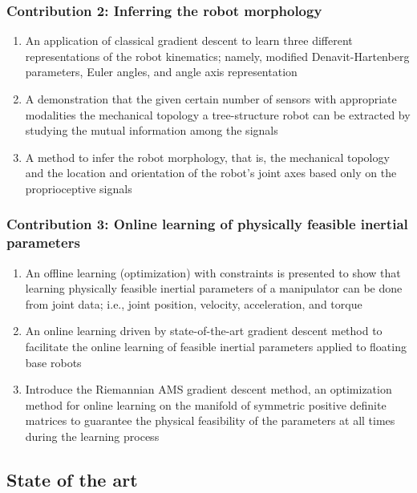 \documentclass[12pt, a4paper]{article}
\begin{document}
\subsubsection*{Contribution 2: Inferring the robot morphology}
\begin{enumerate}
	\item An application of classical gradient descent to learn three different representations of the robot kinematics; namely, modified Denavit-Hartenberg parameters, Euler angles, and angle axis representation
	\item A demonstration that the given certain number of sensors with appropriate modalities the mechanical topology a tree-structure robot can be extracted by studying the mutual information among the signals
	\item A method to infer the robot morphology, that is, the mechanical topology and the location and orientation of the robot's joint axes based only on the proprioceptive signals

\end{enumerate}

\subsubsection*{Contribution 3: Online learning of physically feasible inertial parameters}
\begin{enumerate}
	\item An offline learning (optimization) with constraints is presented to show that learning physically feasible inertial parameters of a manipulator can be done from joint data; i.e., joint position, velocity, acceleration, and torque
	\item An online learning driven by state-of-the-art gradient descent method to facilitate the online learning of feasible inertial parameters applied to floating base robots 
	\item Introduce the Riemannian AMS gradient descent method, an optimization method for online learning on the manifold of symmetric positive definite matrices to guarantee the physical feasibility of the parameters at all times during the learning process
\end{enumerate}

\subsection*{State of the art}
\end{document}
